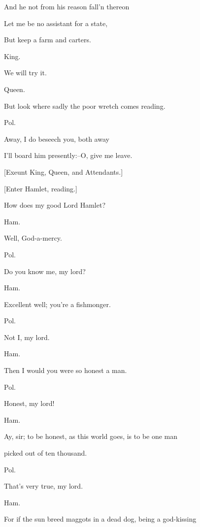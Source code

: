\documentclass[12pt]{book}
\begin{document}
And he not from his reason fall'n thereon

Let me be no assistant for a state,

But keep a farm and carters.



King.

We will try it.



Queen.

But look where sadly the poor wretch comes reading.



Pol.

Away, I do beseech you, both away

I'll board him presently:--O, give me leave.



[Exeunt King, Queen, and Attendants.]



[Enter Hamlet, reading.]



How does my good Lord Hamlet?



Ham.

Well, God-a-mercy.



Pol.

Do you know me, my lord?



Ham.

Excellent well; you're a fishmonger.



Pol.

Not I, my lord.



Ham.

Then I would you were so honest a man.



Pol.

Honest, my lord!



Ham.

Ay, sir; to be honest, as this world goes, is to be one man

picked out of ten thousand.



Pol.

That's very true, my lord.



Ham.

For if the sun breed maggots in a dead dog, being a god-kissing
\end{document}
